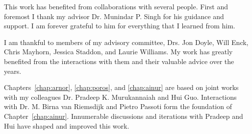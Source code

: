 \begin{acknowledgments}

This work has benefited from collaborations with several people.
First and foremost I thank my advisor Dr. Munindar P. Singh for his guidance and support. 
I am forever grateful to him for everything that I learned from him. 

I am thankful to members of my advisory committee, Drs. Jon Doyle, Will Enck, Chris Mayhorn, Jessica Staddon, and Laurie Williams. 
My work has greatly benefited from the interactions with them and their valuable advice over the years. 

Chapters~\ref{chap:arnor}, \ref{chap:poros}, and \ref{chap:ainur} are based on joint
works with my colleagues Dr. Pradeep K. Murukannaiah and Hui Guo. 
Interactions with Dr. M. Birna van Riemsdijk and Pietro Passoti form the foundation of Chapter~\ref{chap:ainur}.
Innumerable discussions and iterations with Pradeep and Hui have shaped and improved this work. 


\end{acknowledgments}

